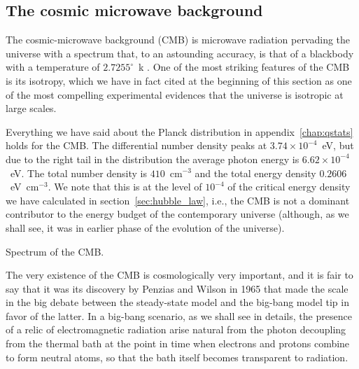 \subsection{The cosmic microwave background}

The cosmic-microwave background (CMB) is microwave radiation pervading the universe
with a spectrum that, to an astounding accuracy, is that of a blackbody with a
temperature of $2.7255^\circ$~k . One of the most striking features of the CMB is its
isotropy,
which we have in fact cited at the beginning of this section as one of the most
compelling experimental evidences that the universe is isotropic at large scales.


Everything we have said about the Planck distribution in appendix~\ref{chap:qstats}
holds for the CMB. The differential number density peaks at $3.74 \times 10^{-4}$~eV,
but due to the right tail in the distribution the average photon energy is
$6.62 \times 10^{-4}$~eV. The total number density is $410$~cm$^{-3}$ and the total
energy density $0.2606$~eV~cm$^{-3}$. We note that this is at the level of $10^{-4}$
of the critical energy density we have calculated in section~\ref{sec:hubble_law},
i.e., the CMB is not a dominant contributor to the energy budget of the contemporary
universe (although, as we shall see, it was in earlier phase of the evolution of the
universe).

\begin{marginfigure}
  
  \caption{Spectrum of the CMB.}
  \label{fig:cmb}
\end{marginfigure}


The very existence of the CMB is cosmologically very important, and it is fair to
say that it was its discovery by Penzias and Wilson in 1965 that made the scale
in the big debate between the steady-state model and the big-bang model tip in favor
of the latter. In a big-bang scenario, as we shall see in details, the presence
of a relic of electromagnetic radiation arise natural from the photon decoupling
from the thermal bath at the point in time when electrons and protons combine to
form neutral atoms, so that the bath itself becomes transparent to radiation.


